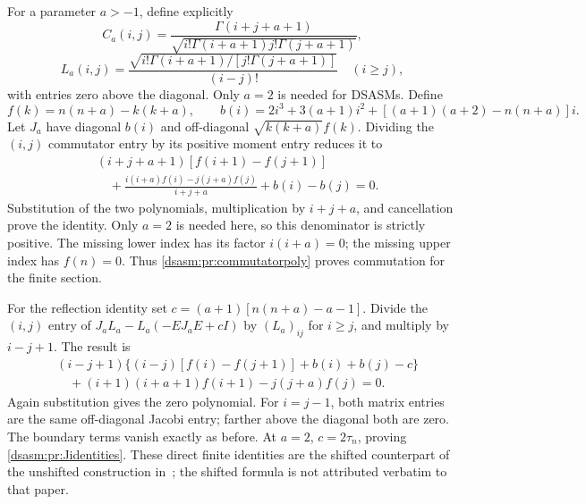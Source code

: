 \documentclass[11pt,letterpaper]{article}
\theoremstyle{remark}\newtheorem{remark}[theorem]{Remark}
\begin{document}
For a parameter $a>-1$, define explicitly
\[
 C_a(i,j)=\frac{\Gamma(i+j+a+1)}
 {\sqrt{i!\Gamma(i+a+1)j!\Gamma(j+a+1)}},
\]
\[
 L_a(i,j)=\frac{\sqrt{i!\Gamma(i+a+1)/[j!\Gamma(j+a+1)]}}{(i-j)!}
 \quad(i\ge j),
\]
with entries zero above the diagonal. Only $a=2$ is needed for DSASMs.
Define
\[
 f(k)=n(n+a)-k(k+a),\qquad
 b(i)=2i^3+3(a+1)i^2+[(a+1)(a+2)-n(n+a)]i.
\]
Let $J_a$ have diagonal $b(i)$ and off-diagonal
$\sqrt{k(k+a)}f(k)$. Dividing the $(i,j)$ commutator entry by its
positive moment entry reduces it to
\begin{equation}\label{dsasm:pr:commutatorpoly}
\begin{split}
 &(i+j+a+1)[f(i+1)-f(j+1)]\\
 &\quad+\frac{i(i+a)f(i)-j(j+a)f(j)}{i+j+a}
       +b(i)-b(j)=0.
\end{split}
\end{equation}
Substitution of the two polynomials, multiplication by $i+j+a$,
and cancellation prove the identity. Only $a=2$ is needed here,
so this denominator is strictly positive. The missing lower index
has its factor $i(i+a)=0$; the missing upper index has $f(n)=0$.
Thus \eqref{dsasm:pr:commutatorpoly} proves commutation for the finite section.

For the reflection identity set
$c=(a+1)[n(n+a)-a-1]$. Divide the $(i,j)$ entry of
$J_aL_a-L_a(-EJ_aE+cI)$ by $(L_a)_{ij}$ for $i\ge j$, and multiply by
$i-j+1$. The result is
\begin{equation}\label{dsasm:pr:reflectionpoly}
\begin{split}
 &(i-j+1)\{(i-j)[f(i)-f(j+1)]+b(i)+b(j)-c\}\\
 &\quad +(i+1)(i+a+1)f(i+1)-j(j+a)f(j)=0.
\end{split}
\end{equation}
Again substitution gives the zero polynomial. For $i=j-1$, both
matrix entries are the same off-diagonal Jacobi entry; farther
above the diagonal both are zero. The boundary terms vanish exactly
as before. At $a=2$, $c=2\tau_n$, proving \eqref{dsasm:pr:Jidentities}.
These direct finite identities are the shifted counterpart of the
unshifted construction in~\cite[Theorems 3.2--3.3 and (4.4)]{cz};
the shifted formula is not attributed verbatim to that paper.
\end{document}

